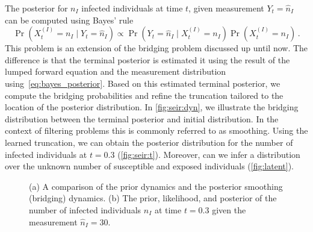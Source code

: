 The posterior for $n_I$ infected individuals at time $t$, given measurement $Y_t=\hat{n}_I$ can be computed using  Bayes' rule
\begin{equation}\label{eq:bayes_posterior}
\Pr(X_t^{(I)}=n_I\mid Y_t=\hat{n}_I)\propto \Pr(Y_t=\hat{n}_I\mid X_t^{(I)} = n_I)\Pr(X_t^{(I)}=n_I)\,.
\end{equation}
This problem is an extension of the bridging problem discussed up until now.
The difference is that the terminal posterior   is   estimated it using the result of the lumped forward equation and the measurement distribution using~\eqref{eq:bayes_posterior}.
Based on this estimated terminal posterior, we compute the bridging probabilities and refine the truncation tailored to the location of the posterior distribution.
In \autoref{fig:seir:dyn}, we illustrate the bridging distribution between the terminal posterior and initial distribution.
In the context of filtering problems this is commonly referred to as smoothing.
Using the learned truncation, we can obtain the posterior distribution for the number of infected individuals at $t=0.3$ (\autoref{fig:seir:t}).
Moreover, can we infer a distribution over the unknown number of susceptible and exposed individuals (\autoref{fig:latent}).
\begin{figure}[t]
    \myfloatalign
	\caption[Bayesian estimation on the \ac{SEIR} model]{
	    (a) A comparison of the prior dynamics and the posterior smoothing (bridging) dynamics.
	    (b) The prior, likelihood, and posterior of the number of infected individuals $n_I$ at time $t=0.3$ given the measurement $\hat{n}_I=30$.}
\end{figure}
